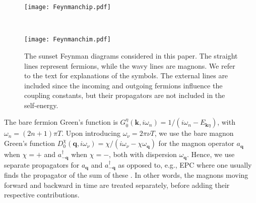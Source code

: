 \documentclass[aps, prb, twocolumn,amsmath,amssymb,floatfix]{revtex4-2}
\begin{document}
\begin{figure}
    \centering
    \begin{minipage}{.48\textwidth}
      \texttt{[image: Feynmanchip.pdf]}
      \label{fig:Feynman+}
    \end{minipage}%
    \\
    \begin{minipage}{.48\textwidth}
      \texttt{[image: Feynmanchim.pdf]}
      \label{fig:feynman-}
    \end{minipage}%
    \caption{The sunset Feynman diagrams considered in this paper. The straight lines represent fermions, while the wavy lines are magnons. We refer to the text for explanations of the symbols. The external lines are included since the incoming and outgoing fermions influence the coupling constants, but their propagators are not included in the self-energy.   \label{fig:Feynman}}
\end{figure}

The bare fermion Green's function is \cite{abrikosov, BruusFlensberg} $G_0^{\eta}(\boldsymbol{k}, i\omega_n) = 1/(i\omega_n-E_{\boldsymbol{k}\eta})$, with $\omega_n = (2n+1)\pi T$. Upon introducing $\omega_\nu = 2\pi \nu T$, we use the bare magnon Green's function \cite{BruusFlensberg} 
$D_0^{\chi} (\boldsymbol{q}, i\omega_\nu) = \chi/(i\omega_\nu -\chi \omega_{\boldsymbol{q}})$
for the magnon operator $a_{\boldsymbol{q}}$ when $\chi = +$ and $a_{-\boldsymbol{q}}^\dagger$ when $\chi = -$, both with dispersion $\omega_{\boldsymbol{q}}$. Hence, we use separate propagators for $a_{\boldsymbol{q}}$ and $a_{-\boldsymbol{q}}^\dagger$ as opposed to, e.g., EPC where one usually finds the propagator of the sum of these \cite{elphcselfenergyprltse}. 
In other words, the magnons moving forward and backward in time are treated separately, before adding their respective contributions.
\end{document}
